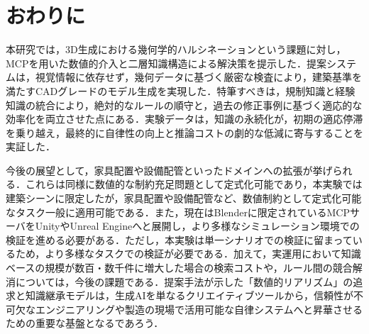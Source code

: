 \documentclass[dvipdfmx, a4paper, 9pt]{deimj}
\begin{document}
\section{おわりに}

本研究では，3D生成における幾何学的ハルシネーションという課題に対し，MCPを用いた数値的介入と二層知識構造による解決策を提示した．提案システムは，視覚情報に依存せず，幾何データに基づく厳密な検査により，建築基準を満たすCADグレードのモデル生成を実現した．特筆すべきは，規制知識と経験知識の統合により，絶対的なルールの順守と，過去の修正事例に基づく適応的な効率化を両立させた点にある．実験データは，知識の永続化が，初期の適応停滞を乗り越え，最終的に自律性の向上と推論コストの劇的な低減に寄与することを実証した．

今後の展望として，家具配置や設備配管といったドメインへの拡張が挙げられる．これらは同様に数値的な制約充足問題として定式化可能であり，本実験では建築シーンに限定したが，家具配置や設備配管など、数値制約として定式化可能なタスク一般に適用可能である．また，現在はBlenderに限定されているMCPサーバをUnityやUnreal Engineへと展開し，より多様なシミュレーション環境での検証を進める必要がある．ただし，本実験は単一シナリオでの検証に留まっているため，より多様なタスクでの検証が必要である．加えて，実運用において知識ベースの規模が数百・数千件に増大した場合の検索コストや，ルール間の競合解消については，今後の課題である．提案手法が示した「数値的リアリズム」の追求と知識継承モデルは，生成AIを単なるクリエイティブツールから，信頼性が不可欠なエンジニアリングや製造の現場で活用可能な自律システムへと昇華させるための重要な基盤となるであろう．




\end{document}
